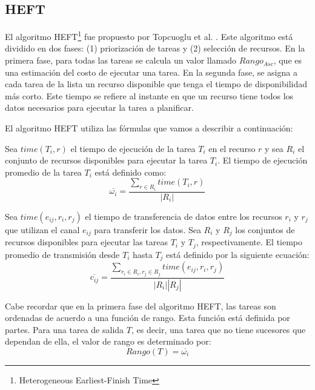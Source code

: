 \subsection{HEFT}
El algoritmo HEFT\footnote{Heterogeneous Earliest-Finish Time} fue propuesto por Topcuoglu et al. \cite{topcuoglu2002performance}. Este algoritmo está dividido en dos fases: (1) priorización de tareas y (2) selección de recursos. En la primera fase, para todas las tareas se calcula un valor llamado $Rango_{Asc}$, que es una estimación del costo de ejecutar una tarea. En la segunda fase, se asigna a cada tarea de la lista un recurso disponible que tenga el tiempo de disponibilidad más corto. Este tiempo se refiere al instante en que un recurso tiene todos los datos necesarios para ejecutar la tarea a planificar.




El algoritmo HEFT utiliza las fórmulas que vamos a describir a continuación:


Sea $time(T_i, r)$ el tiempo de ejecución de la tarea $T_i$ en el recurso $r$ y sea $R_i$ el conjunto de recursos disponibles para ejecutar la tarea $T_i$. El tiempo de ejecución promedio de la tarea $T_i$ está definido como:
\begin{equation}
\label{ecc:heft1}
\overline{\omega_i} = \frac{\sum_{r \in R_i} time(T_i, r)}{|R_i|}
\end{equation}

Sea $time(e_{ij}, r_i, r_j)$ el tiempo de transferencia de datos entre los recursos $r_i$ y $r_j$ que utilizan el canal $e_{ij}$ para transferir los datos. Sea $R_i$ y $R_j$ los conjuntos de recursos disponibles para ejecutar las tareas $T_i$ y $T_j$, respectivamente. El tiempo promedio de transmisión desde $T_i$ hasta $T_j$ está definido por la siguiente ecuación:
\begin{equation}
\label{ecc:heft2}
\overline{c_{ij}} = \frac{ \sum_{r_i \in R_i, r_j \in R_j} {time(e_{ij}, r_i, r_j)} }{|R_i| |R_j|}
\end{equation}

Cabe recordar que en la primera fase del algoritmo HEFT, las tareas son ordenadas de acuerdo a una función de rango. Esta función está definida por partes. Para una tarea de salida $T$, es decir, una tarea que no tiene sucesores que dependan de ella, el valor de rango es determinado por:
\begin{equation}
\label{ecc:heft3}
Rango(T) = \overline{\omega_i}
\end{equation}

